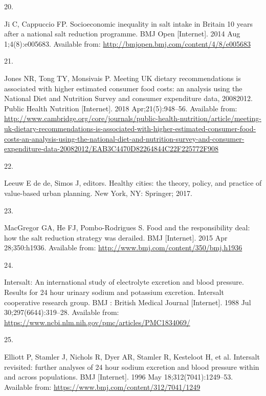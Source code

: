\documentclass[
]{article}
\newlength{\cslhangindent}
\newlength{\csllabelwidth}
\newlength{\cslentryspacingunit} %
\newenvironment{CSLReferences}[2] %
 {%
  \setlength{\parindent}{0pt}
  \ifodd #1
  \let\oldpar\par
  \def\par{\hangindent=\cslhangindent\oldpar}
  \fi
  \setlength{\parskip}{#2\cslentryspacingunit}
 }%
 {}
\newcommand{\CSLLeftMargin}[1]{\parbox[t]{\csllabelwidth}{#1}}
\newcommand{\CSLRightInline}[1]{\parbox[t]{\linewidth - \csllabelwidth}{#1}\break}
\begin{document}
\begin{CSLReferences}{0}{0}
\leavevmode{}%
\CSLLeftMargin{20. }%
\CSLRightInline{Ji C, Cappuccio FP. Socioeconomic inequality in salt
intake in Britain 10 years after a national salt reduction programme.
BMJ Open {[}Internet{]}. 2014 Aug 1;4(8):e005683. Available from:
\url{http://bmjopen.bmj.com/content/4/8/e005683}}

\leavevmode{}%
\CSLLeftMargin{21. }%
\CSLRightInline{Jones NR, Tong TY, Monsivais P. Meeting UK dietary
recommendations is associated with higher estimated consumer food costs:
an analysis using the National Diet and Nutrition Survey and consumer
expenditure data, 2008{\textendash}2012. Public Health Nutrition
{[}Internet{]}. 2018 Apr;21(5):948--56. Available from:
\url{http://www.cambridge.org/core/journals/public-health-nutrition/article/meeting-uk-dietary-recommendations-is-associated-with-higher-estimated-consumer-food-costs-an-analysis-using-the-national-diet-and-nutrition-survey-and-consumer-expenditure-data-20082012/EAB3C4470D82264844C22F225772F908}}

\leavevmode{}%
\CSLLeftMargin{22. }%
\CSLRightInline{Leeuw E de de, Simos J, editors. Healthy cities: the
theory, policy, and practice of value-based urban planning. New York,
NY: Springer; 2017. }

\leavevmode{}%
\CSLLeftMargin{23. }%
\CSLRightInline{MacGregor GA, He FJ, Pombo-Rodrigues S. Food and the
responsibility deal: how the salt reduction strategy was derailed. BMJ
{[}Internet{]}. 2015 Apr 28;350:h1936. Available from:
\url{http://www.bmj.com/content/350/bmj.h1936}}

\leavevmode{}%
\CSLLeftMargin{24. }%
\CSLRightInline{Intersalt: An international study of electrolyte
excretion and blood pressure. Results for 24 hour urinary sodium and
potassium excretion. Intersalt cooperative research group. BMJ : British
Medical Journal {[}Internet{]}. 1988 Jul 30;297(6644):319--28. Available
from: \url{https://www.ncbi.nlm.nih.gov/pmc/articles/PMC1834069/}}

\leavevmode{}%
\CSLLeftMargin{25. }%
\CSLRightInline{Elliott P, Stamler J, Nichols R, Dyer AR, Stamler R,
Kesteloot H, et al. Intersalt revisited: further analyses of 24 hour
sodium excretion and blood pressure within and across populations. BMJ
{[}Internet{]}. 1996 May 18;312(7041):1249--53. Available from:
\url{https://www.bmj.com/content/312/7041/1249}}


\end{CSLReferences}
\end{document}
